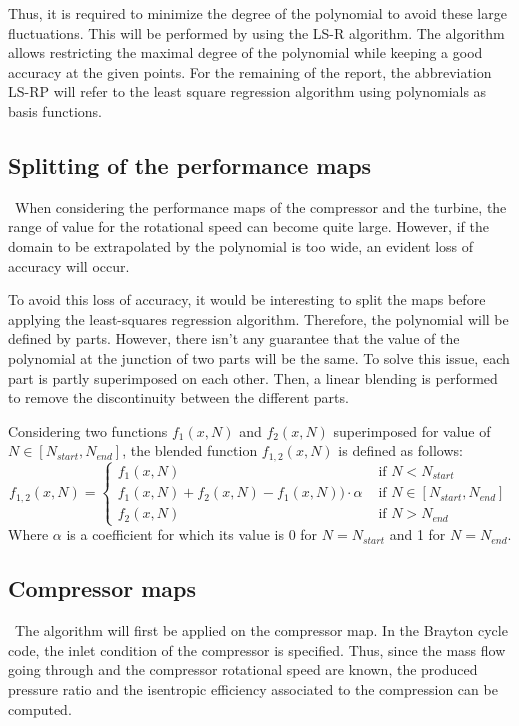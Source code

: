 Thus, it is required to minimize the degree of the polynomial to avoid these large fluctuations. This will be performed by  using the LS-R algorithm. The algorithm allows restricting the maximal degree of the polynomial while keeping a good accuracy at the given points. For the remaining of the report, the abbreviation LS-RP will refer to the least square regression algorithm using polynomials as basis functions.

\subsection{Splitting of the performance maps}
\quad\ When considering the performance maps of the compressor and the turbine, the range of value for the rotational speed can become quite large. However, if the domain to be extrapolated by the polynomial is too wide, an evident loss of accuracy will occur. 

To avoid this loss of accuracy, it would be interesting to split the maps before applying the least-squares regression algorithm. Therefore, the polynomial will be defined by parts. However, there isn't any guarantee that the value of the polynomial at the junction of two parts will be the same. To solve this issue, each part is partly superimposed on each other. Then, a linear blending is performed to remove the discontinuity between the different parts. 

Considering two functions $f_1(x,N)$ and $f_2(x,N)$ superimposed for value of $N\in [N_{start},N_{end}]$, the blended function $f_{1,2}(x,N)$ is defined as follows:
\begin{equation}
 f_{1,2}(x,N) = \begin{cases}
f_1(x,N) &\text{ if }N<N_{start}\\
f_1(x,N) + f_2(x,N) - f_1(x,N))\cdot \alpha &\text{ if } N\in [N_{start},N_{end}]\\
f_2(x,N) &\text{ if }N>N_{end}
\end{cases}   
\end{equation}
Where $\alpha$ is a coefficient for which its value is 0 for $N = N_{start}$ and 1 for $N = N_{end}$.  
\subsection{Compressor maps}
\quad\ The algorithm will first be applied on the compressor map. In the Brayton cycle code, the inlet condition of the compressor is specified. Thus, since the mass flow going through and the compressor rotational speed are known, the produced pressure ratio and the isentropic efficiency associated to the compression can be computed.

